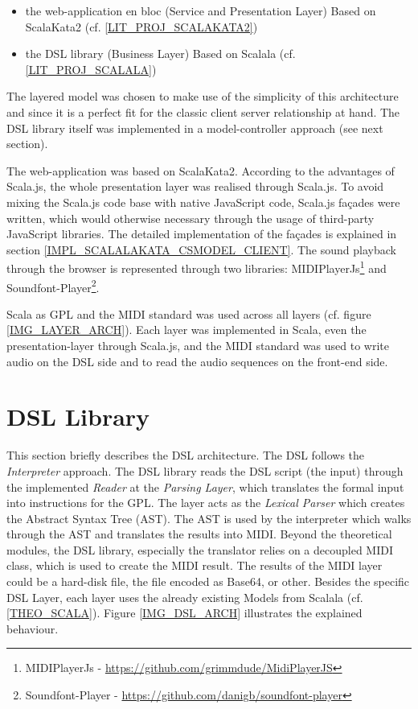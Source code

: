 \begin{itemize}
\item the web-application en bloc (Service and Presentation Layer) \newline Based on ScalaKata2 (cf. \ref{LIT_PROJ_SCALAKATA2})
\item the DSL library (Business Layer) \newline Based on Scalala (cf. \ref{LIT_PROJ_SCALALA})
\end{itemize}

The layered model was chosen to make use of the simplicity of this architecture and since it is a perfect fit for the classic client server relationship at hand. The DSL library itself was implemented in a model-controller approach (see next section).

The web-application was based on ScalaKata2. According to the advantages of Scala.js, the whole presentation layer was realised through Scala.js. To avoid mixing the Scala.js code base with native JavaScript code, Scala.js façades were written, which would otherwise necessary through the usage of third-party JavaScript libraries. The detailed implementation of the façades is explained in section \ref{IMPL_SCALALAKATA_CSMODEL_CLIENT}. The sound playback through the browser is represented through two libraries: MIDIPlayerJs\footnote{MIDIPlayerJs - \url{https://github.com/grimmdude/MidiPlayerJS}} and Soundfont-Player\footnote{Soundfont-Player - \url{https://github.com/danigb/soundfont-player}}.

Scala as GPL and the MIDI standard was used across all layers (cf. figure \ref{IMG_LAYER_ARCH}). Each layer was implemented in Scala, even the presentation-layer through Scala.js, and the MIDI standard was used to write audio on the DSL side and to read the audio sequences on the front-end side.

\section{DSL Library}
\label{ARCH_DSL}
This section briefly describes the DSL architecture. The DSL follows the \textit{Interpreter} approach. The DSL library reads the DSL script (the input) through the implemented \textit{Reader} at the \textit{Parsing Layer}, which translates the formal input into instructions for the GPL.\cite{Riti2018} The layer acts as the \textit{Lexical Parser} which creates the Abstract Syntax Tree (AST). The AST is used by the interpreter which walks through the AST and translates the results into MIDI. Beyond the theoretical modules, the DSL library, especially the translator relies on a decoupled MIDI class, which is used to create the MIDI result. The results of the MIDI layer could be a hard-disk file, the file encoded as Base64, or other. Besides the specific DSL Layer, each layer uses the already existing Models from Scalala (cf. \ref{THEO_SCALA}). Figure \ref{IMG_DSL_ARCH} illustrates the explained behaviour.

